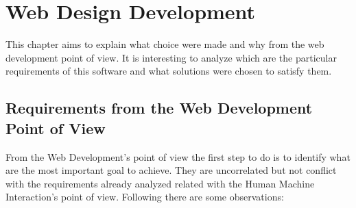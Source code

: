 
\chapter{Web Design Development} %

\label{Chapter 9} %


This chapter aims to explain what choice were made and why from the web development point of view. It is interesting to analyze which are the particular requirements of this software and what solutions were chosen to satisfy them. 

\section{Requirements from the Web Development Point of View}

From the Web Development's point of view the first step to do is to identify what are the most important goal to achieve. They are uncorrelated but not conflict with the requirements already analyzed related with the Human Machine Interaction's point of view. Following there are some observations:

